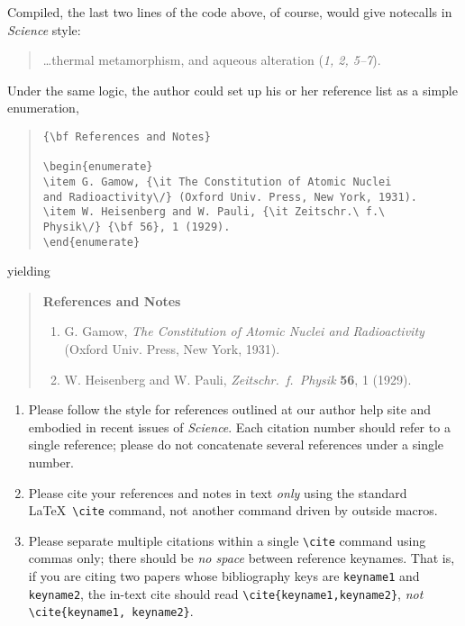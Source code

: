 \documentclass[12pt]{article}
\begin{document}
\noindent Compiled, the last two lines of the code above, of course, would give notecalls in {\it Science\/} style:

\begin{quote}
\ldots thermal metamorphism, and aqueous alteration ({\it 1, 2, 5--7\/}).
\end{quote}

Under the same logic, the author could set up his or her reference list as a simple enumeration,

\begin{quote}
\begin{verbatim}
{\bf References and Notes}

\begin{enumerate}
\item G. Gamow, {\it The Constitution of Atomic Nuclei
and Radioactivity\/} (Oxford Univ. Press, New York, 1931).
\item W. Heisenberg and W. Pauli, {\it Zeitschr.\ f.\ 
Physik\/} {\bf 56}, 1 (1929).
\end{enumerate}
\end{verbatim}
\end{quote}

\noindent yielding

\begin{quote}
{\bf References and Notes}

\begin{enumerate}
\item G. Gamow, {\it The Constitution of Atomic Nuclei and
Radioactivity\/} (Oxford Univ. Press, New York, 1931).
\item W. Heisenberg and W. Pauli, {\it Zeitschr.\ f.\ Physik} {\bf 56},
1 (1929).
\end{enumerate}
\end{quote}


\begin{enumerate}
\item Please follow the style for references outlined at our author
  help site and embodied in recent issues of {\it Science}.  Each
  citation number should refer to a single reference; please do not
  concatenate several references under a single number.
\item Please cite your references and notes in text {\it only\/} using
  the standard \LaTeX\ \verb+\cite+ command, not another command
  driven by outside macros.
\item Please separate multiple citations within a single \verb+\cite+
  command using commas only; there should be {\it no space\/}
  between reference keynames.  That is, if you are citing two
  papers whose bibliography keys are \texttt{keyname1} and
  \texttt{keyname2}, the in-text cite should read
  \verb+\cite{keyname1,keyname2}+, {\it not\/}
  \verb+\cite{keyname1, keyname2}+.
\end{enumerate}
\end{document}
